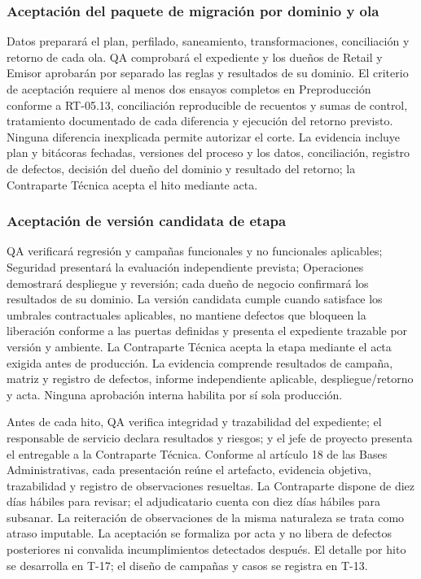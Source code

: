 \documentclass[11pt]{article}
\begin{document}
\subsubsection{Aceptación del paquete de migración por dominio y ola}

Datos preparará el plan, perfilado, saneamiento, transformaciones, conciliación y retorno de cada ola. QA comprobará el expediente y los dueños de Retail y Emisor aprobarán por separado las reglas y resultados de su dominio. El criterio de aceptación requiere al menos dos ensayos completos en Preproducción conforme a RT-05.13, conciliación reproducible de recuentos y sumas de control, tratamiento documentado de cada diferencia y ejecución del retorno previsto. Ninguna diferencia inexplicada permite autorizar el corte. La evidencia incluye plan y bitácoras fechadas, versiones del proceso y los datos, conciliación, registro de defectos, decisión del dueño del dominio y resultado del retorno; la Contraparte Técnica acepta el hito mediante acta.

\subsubsection{Aceptación de versión candidata de etapa}

QA verificará regresión y campañas funcionales y no funcionales aplicables; Seguridad presentará la evaluación independiente prevista; Operaciones demostrará despliegue y reversión; cada dueño de negocio confirmará los resultados de su dominio. La versión candidata cumple cuando satisface los umbrales contractuales aplicables, no mantiene defectos que bloqueen la liberación conforme a las puertas definidas y presenta el expediente trazable por versión y ambiente. La Contraparte Técnica acepta la etapa mediante el acta exigida antes de producción. La evidencia comprende resultados de campaña, matriz y registro de defectos, informe independiente aplicable, despliegue/retorno y acta. Ninguna aprobación interna habilita por sí sola producción.

Antes de cada hito, QA verifica integridad y trazabilidad del expediente; el responsable de servicio declara resultados y riesgos; y el jefe de proyecto presenta el entregable a la Contraparte Técnica. Conforme al artículo 18 de las Bases Administrativas, cada presentación reúne el artefacto, evidencia objetiva, trazabilidad y registro de observaciones resueltas. La Contraparte dispone de diez días hábiles para revisar; el adjudicatario cuenta con diez días hábiles para subsanar. La reiteración de observaciones de la misma naturaleza se trata como atraso imputable. La aceptación se formaliza por acta y no libera de defectos posteriores ni convalida incumplimientos detectados después. El detalle por hito se desarrolla en T-17; el diseño de campañas y casos se registra en T-13.
\end{document}
